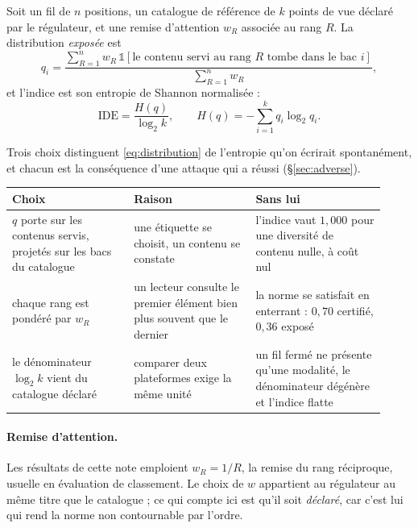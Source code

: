 \documentclass[11pt,a4paper]{article}
\begin{document}
Soit un fil de $n$ positions, un catalogue de référence de $k$ points de vue déclaré par le
régulateur, et une remise d'attention $w_R$ associée au rang $R$. La distribution
\emph{exposée} est
\begin{equation}
q_i = \frac{\sum_{R=1}^{n} w_R \, \mathbb{1}\!\left[\text{le contenu servi au rang } R
      \text{ tombe dans le bac } i\right]}{\sum_{R=1}^{n} w_R},
\label{eq:distribution}
\end{equation}
et l'indice est son entropie de Shannon normalisée :
\begin{equation}
\mathrm{IDE} = \frac{H(q)}{\log_2 k}, \qquad H(q) = -\sum_{i=1}^{k} q_i \log_2 q_i .
\label{eq:ide}
\end{equation}

Trois choix distinguent \eqref{eq:distribution} de l'entropie qu'on écrirait spontanément,
et chacun est la conséquence d'une attaque qui a réussi (\S\ref{sec:adverse}).

\begin{center}
\begin{tabular}{@{}p{0.30\linewidth}p{0.30\linewidth}p{0.32\linewidth}@{}}
\toprule
\textbf{Choix} & \textbf{Raison} & \textbf{Sans lui} \\
\midrule
$q$ porte sur les contenus servis, projetés sur les bacs du catalogue & une étiquette se
choisit, un contenu se constate & l'indice vaut $1{,}000$ pour une diversité de contenu
nulle, à coût nul \\[2mm]
chaque rang est pondéré par $w_R$ & un lecteur consulte le premier élément bien plus souvent
que le dernier & la norme se satisfait en enterrant : $0{,}70$ certifié, $0{,}36$ exposé \\[2mm]
le dénominateur $\log_2 k$ vient du catalogue déclaré & comparer deux plateformes exige la
même unité & un fil fermé ne présente qu'une modalité, le dénominateur dégénère et l'indice
flatte \\
\bottomrule
\end{tabular}
\end{center}

\paragraph{Remise d'attention.} Les résultats de cette note emploient $w_R = 1/R$, la remise
du rang réciproque, usuelle en évaluation de classement. Le choix de $w$ appartient au
régulateur au même titre que le catalogue ; ce qui compte ici est qu'il soit \emph{déclaré},
car c'est lui qui rend la norme non contournable par l'ordre.
\end{document}
